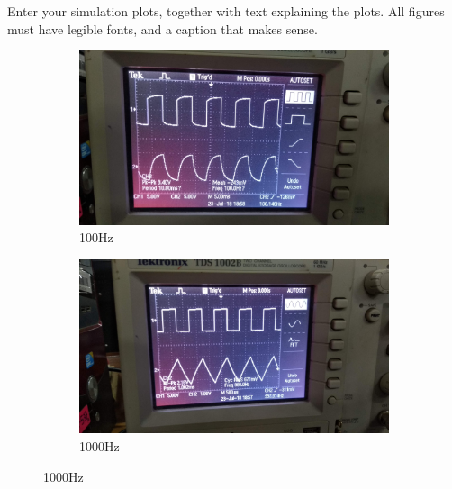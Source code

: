 \documentclass[12pt]{article}
\begin{document}
	Enter your simulation plots, together with text explaining the plots. All figures must have legible fonts, and a caption that makes sense.
 \begin{figure}[h]
 \centering
 \begin{subfigure}{.5\textwidth}
   \centering
   \includegraphics[scale=0.045]{100hz.jpg}
   \caption{100Hz}
   \label{fig:sub1}
 \end{subfigure}%
 \begin{subfigure}{.5\textwidth}
   \centering
   \includegraphics[scale=0.045]{1000hz.jpg}
   \caption{1000Hz}
   \label{fig:sub2}
 \end{subfigure}
 \label{fig:test}
 \end{figure}
\end{document}
